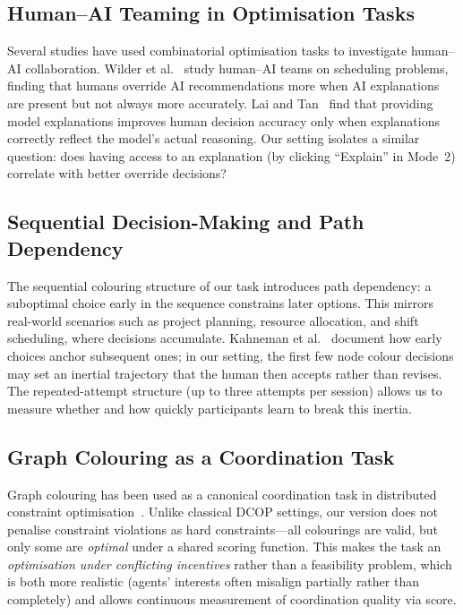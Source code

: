 \documentclass[11pt]{article}
\theoremstyle{definition}
\begin{document}
\subsection{Human--AI Teaming in Optimisation Tasks}

Several studies have used combinatorial optimisation tasks to investigate human--AI
collaboration.  Wilder et al.~\citeyearpar{wilder2021learning} study human--AI teams on
scheduling problems, finding that humans override AI recommendations more when AI
explanations are present but not always more accurately.  Lai and Tan~\citeyearpar{lai2019human}
find that providing model explanations improves human decision accuracy only when
explanations correctly reflect the model's actual reasoning.  Our setting isolates a
similar question: does having access to an explanation (by clicking ``Explain'' in Mode~2)
correlate with better override decisions?

\subsection{Sequential Decision-Making and Path Dependency}

The sequential colouring structure of our task introduces path dependency: a suboptimal
choice early in the sequence constrains later options.  This mirrors real-world scenarios
such as project planning, resource allocation, and shift scheduling, where decisions
accumulate.  Kahneman et al.~\citeyearpar{kahneman1982judgment} document how early choices
anchor subsequent ones; in our setting, the first few node colour decisions may set an
inertial trajectory that the human then accepts rather than revises.  The repeated-attempt
structure (up to three attempts per session) allows us to measure whether and how quickly
participants learn to break this inertia.

\subsection{Graph Colouring as a Coordination Task}

Graph colouring has been used as a canonical coordination task in distributed constraint
optimisation~\citep{modi2005adopt,rogers2011bounded}.  Unlike classical DCOP settings,
our version does not penalise constraint violations as hard constraints---all colourings
are valid, but only some are \emph{optimal} under a shared scoring function.  This makes
the task an \emph{optimisation under conflicting incentives} rather than a feasibility
problem, which is both more realistic (agents' interests often misalign partially rather
than completely) and allows continuous measurement of coordination quality via score.
\end{document}
